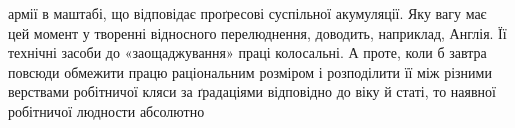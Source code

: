 армії в маштабі, що відповідає проґресові суспільної
акумуляції. Яку вагу має цей момент у творенні відносного перелюднення,
доводить, наприклад, Англія. Її технічні засоби до
«заощаджування» праці колосальні. А проте, коли б завтра
повсюди обмежити працю раціональним розміром і розподілити
її між різними верствами робітничої кляси за ґрадаціями відповідно
до віку й статі, то наявної робітничої людности абсолютно